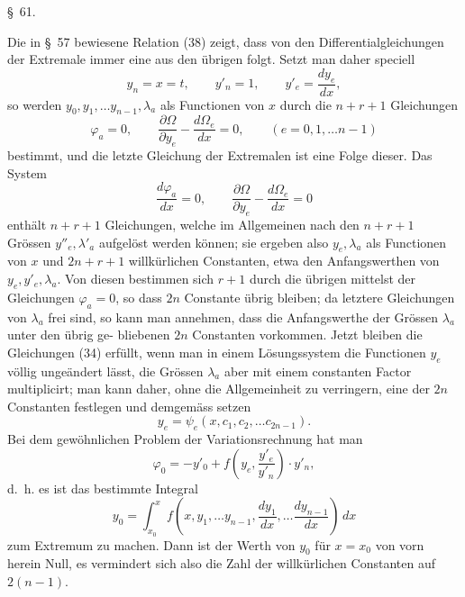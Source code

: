 \documentclass[11pt,a4paper,leqno]{article}
\begin{document}


\begin{center}
{\large \S~61.}
\end{center}

Die in \S~57 bewiesene Relation (38) zeigt, dass von den
Differentialgleichungen der Extremale immer eine aus den übrigen
folgt. Setzt man daher speciell
\[
y_n=x=t,\qquad y'_n=1,\qquad y'_e=\frac{dy_e}{dx},
\]
so werden $y_0,y_1,\ldots y_{n-1},\lambda_a$ als Functionen von $x$ durch die
$n+r+1$ Gleichungen
\begin{equation}\tag{68}
\varphi_a=0,\qquad
\frac{\partial\Omega}{\partial y_e}-\frac{d\Omega_e}{dx}=0,
\qquad(e=0,1,\ldots n-1)
\end{equation}
bestimmt, und die letzte Gleichung der Extremalen ist eine Folge
dieser. Das System
\[
\frac{d\varphi_a}{dx}=0,\qquad
\frac{\partial\Omega}{\partial y_e}-\frac{d\Omega_e}{dx}=0
\]
enthält $n+r+1$ Gleichungen, welche im Allgemeinen nach
den $n+r+1$ Grössen $y''_e,\lambda'_a$ aufgelöst werden können; sie
ergeben also $y_e,\lambda_a$ als Functionen von $x$ und $2n+r+1$ willkürlichen
Constanten, etwa den Anfangswerthen von $y_e,y'_e,\lambda_a$.
Von diesen bestimmen sich $r+1$ durch die übrigen mittelst
der Gleichungen $\varphi_a=0$, so dass $2n$ Constante übrig bleiben;
da letztere Gleichungen von $\lambda_a$ frei sind, so kann man annehmen,
dass die Anfangswerthe der Grössen $\lambda_a$ unter den übrig ge-
bliebenen $2n$ Constanten vorkommen. Jetzt bleiben die Gleichungen
(34) erfüllt, wenn man in einem Lösungssystem die
Functionen $y_e$ völlig ungeändert lässt, die Grössen $\lambda_a$ aber mit
einem constanten Factor multiplicirt; man kann daher, ohne die
Allgemeinheit zu verringern, eine der $2n$ Constanten festlegen
und demgemäss setzen
\begin{equation}\tag{69}
y_e=\psi_e(x,c_1,c_2,\ldots c_{2n-1}).
\end{equation}
Bei dem gewöhnlichen Problem der Variationsrechnung hat
man
\[
\varphi_0=-y'_0+f\left(y_e,\frac{y'_e}{y'_n}\right)\cdot y'_n,
\]
d.~h. es ist das bestimmte Integral
\[
y_0=\int_{x_0}^{x}
f\left(x,y_1,\ldots y_{n-1},\frac{dy_1}{dx},\ldots\frac{dy_{n-1}}{dx}\right)\,dx
\]
zum Extremum zu machen. Dann ist der Werth von $y_0$ für
$x=x_0$ von vorn herein Null, es vermindert sich also die Zahl
der willkürlichen Constanten auf $2(n-1)$.
\end{document}
